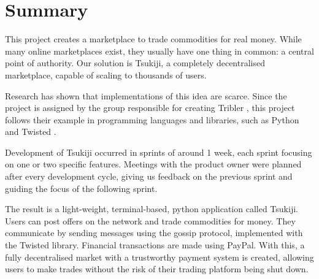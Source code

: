 \section*{Summary} 
This project creates a marketplace to trade commodities for real money.
While many online marketplaces exist, they usually have one thing in common: a central point of authority.
Our solution is Tsukiji, a completely decentralised marketplace, capable of scaling to thousands of users.

Research has shown that implementations of this idea are scarce.
Since the project is assigned by the group responsible for creating Tribler \cite{tribler}, this project follows their example in programming languages and libraries, such as Python and Twisted \cite{twisted}.

Development of Tsukiji occurred in sprints of around 1 week, each sprint focusing on one or two specific features.
Meetings with the product owner were planned after every development cycle, giving us feedback on the previous sprint and guiding the focus of the following sprint.

The result is a light-weight, terminal-based, python application called Tsukiji.
Users can post offers on the network and trade commodities for money.
They communicate by sending messages using the gossip protocol, implemented with the Twisted library.
Financial transactions are made using PayPal.
With this, a fully decentralised market with a trustworthy payment system is created, allowing users to make trades without the risk of their trading platform being shut down.